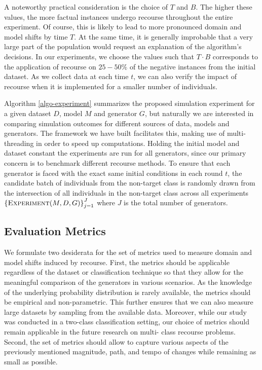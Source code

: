 \documentclass[
  conference]{IEEEtran}
\begin{document}
A noteworthy practical consideration is the choice of \(T\) and \(B\).
The higher these values, the more factual instances undergo recourse
throughout the entire experiment. Of course, this is likely to lead to
more pronounced domain and model shifts by time \(T\). At the same time,
it is generally improbable that a very large part of the population
would request an explanation of the algorithm's decisions. In our
experiments, we choose the values such that \(T \cdot B\) corresponds to
the application of recourse on \(25-50\%\) of the negative instances
from the initial dataset. As we collect data at each time \(t\), we can
also verify the impact of recourse when it is implemented for a smaller
number of individuals.

Algorithm \ref{algo-experiment} summarizes the proposed simulation
experiment for a given dataset \(D\), model \(M\) and generator \(G\),
but naturally we are interested in comparing simulation outcomes for
different sources of data, models and generators. The framework we have
built facilitates this, making use of multi-threading in order to speed
up computations. Holding the initial model and dataset constant the
experiments are run for all generators, since our primary concern is to
benchmark different recourse methods. To ensure that each generator is
faced with the exact same initial conditions in each round \(t\), the
candidate batch of individuals from the non-target class is randomly
drawn from the intersection of all individuals in the non-target class
across all experiments
\(\left\{\textsc{Experiment}(M,D,G)\right\}_{j=1}^J\) where \(J\) is the
total number of generators.

\hypertarget{sec-method-2-metrics}{%
\subsection{Evaluation Metrics}\label{sec-method-2-metrics}}

We formulate two desiderata for the set of metrics used to measure
domain and model shifts induced by recourse. First, the metrics should
be applicable regardless of the dataset or classification technique so
that they allow for the meaningful comparison of the generators in
various scenarios. As the knowledge of the underlying probability
distribution is rarely available, the metrics should be empirical and
non-parametric. This further ensures that we can also measure large
datasets by sampling from the available data. Moreover, while our study
was conducted in a two-class classification setting, our choice of
metrics should remain applicable in the future research on multi- class
recourse problems. Second, the set of metrics should allow to capture
various aspects of the previously mentioned magnitude, path, and tempo
of changes while remaining as small as possible.
\end{document}
